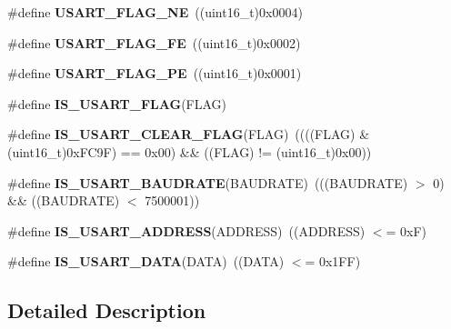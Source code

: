 \begin{DoxyCompactItemize}
\item 
\mbox{\label{group___u_s_a_r_t___flags_ga81781d27ffc8b85dfaf7b7b791229547}} 
\#define {\bfseries U\+S\+A\+R\+T\+\_\+\+F\+L\+A\+G\+\_\+\+NE}~((uint16\+\_\+t)0x0004)
\item 
\mbox{\label{group___u_s_a_r_t___flags_ga3551a32bac49a2ec040e5fdafcc9c4bd}} 
\#define {\bfseries U\+S\+A\+R\+T\+\_\+\+F\+L\+A\+G\+\_\+\+FE}~((uint16\+\_\+t)0x0002)
\item 
\mbox{\label{group___u_s_a_r_t___flags_ga5e87fde5704f27c75df25395e23404ad}} 
\#define {\bfseries U\+S\+A\+R\+T\+\_\+\+F\+L\+A\+G\+\_\+\+PE}~((uint16\+\_\+t)0x0001)
\item 
\#define {\bfseries I\+S\+\_\+\+U\+S\+A\+R\+T\+\_\+\+F\+L\+AG}(F\+L\+AG)
\item 
\mbox{\label{group___u_s_a_r_t___flags_gadc905fdce8defba31c00c95554a26bc3}} 
\#define {\bfseries I\+S\+\_\+\+U\+S\+A\+R\+T\+\_\+\+C\+L\+E\+A\+R\+\_\+\+F\+L\+AG}(F\+L\+AG)~((((F\+L\+AG) \& (uint16\+\_\+t)0x\+F\+C9\+F) == 0x00) \&\& ((\+F\+L\+A\+G) != (uint16\+\_\+t)0x00))
\item 
\mbox{\label{group___u_s_a_r_t___flags_ga9dc365e0a1e01031a8e0757a34b9d420}} 
\#define {\bfseries I\+S\+\_\+\+U\+S\+A\+R\+T\+\_\+\+B\+A\+U\+D\+R\+A\+TE}(B\+A\+U\+D\+R\+A\+TE)~(((B\+A\+U\+D\+R\+A\+TE) $>$ 0) \&\& ((B\+A\+U\+D\+R\+A\+TE) $<$ 7500001))
\item 
\mbox{\label{group___u_s_a_r_t___flags_ga194e771c3324f9e130b2887c701460a7}} 
\#define {\bfseries I\+S\+\_\+\+U\+S\+A\+R\+T\+\_\+\+A\+D\+D\+R\+E\+SS}(A\+D\+D\+R\+E\+SS)~((A\+D\+D\+R\+E\+SS) $<$= 0x\+F)
\item 
\mbox{\label{group___u_s_a_r_t___flags_gafd6307e41818e076d31f3c24cb5ba135}} 
\#define {\bfseries I\+S\+\_\+\+U\+S\+A\+R\+T\+\_\+\+D\+A\+TA}(D\+A\+TA)~((D\+A\+TA) $<$= 0x1\+F\+F)
\end{DoxyCompactItemize}


\subsection{Detailed Description}


